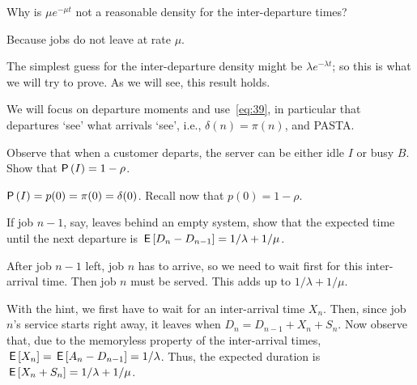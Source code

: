 \begin{exercise}
Why is $\mu e^{-\mu t}$ not a reasonable density for the
    inter-departure times?
    \begin{solution}
         Because jobs do not leave at rate $\mu$. 
    \end{solution}
\end{exercise}

The simplest guess for the inter-departure density might be $\lambda e^{-\lambda t}$; so this is what we will try to prove. As we will see, this result holds. 

We will focus on departure moments and use~\eqref{eq:39}, in particular that departures `see' what arrivals `see', i.e., $\delta(n)= \pi(n)$, and PASTA.


\begin{exercise}
 Observe that when a customer departs, the server can be either
    idle $I$ or busy $B$.   Show that $\P{I} = 1-\rho$.
    \begin{solution}
 $\P I = p(0) =\pi(0)=\delta(0)$.  Recall now that $p(0) = 1-\rho$.
    \end{solution}
\end{exercise}

\begin{exercise}\label{ex:17}
 If job $n-1$, say, leaves behind an empty system, show that the expected time until the next departure is $\,\mathsf{E}\left[D_n - D_{n-1}\right] = 1/\lambda + 1/\mu$. 
    \begin{hint}
      After job $n-1$ left, job $n$ has to arrive, so we need to wait first for this inter-arrival time. Then job $n$ must be served. This adds up to $1/\lambda + 1/\mu$. 
    \end{hint}
    \begin{solution}
With the hint, we first have to wait for an inter-arrival
    time $X_n$. Then, since job $n$'s service starts right away, it
    leaves when $D_n = D_{n-1}+X_n + S_n$. Now observe that, due to the memoryless property of the inter-arrival times, $\,\mathsf{E}\left[X_n\right] = \,\mathsf{E}\left[A_n - D_{n-1}\right] = 1/\lambda$. Thus, the expected duration is $\,\mathsf{E}\left[X_n + S_n\right]=1/\lambda + 1/\mu$. 
    \end{solution}
\end{exercise}

